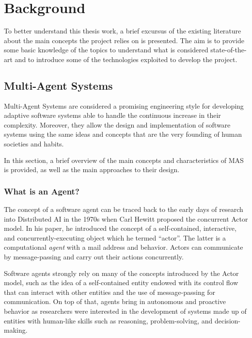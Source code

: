 \chapter{Background}\label{background}
To better understand this thesis work, a brief excursus of the existing literature about the main concepts the project relies on is presented. The aim is to provide some basic knowledge of the topics to understand what is considered state-of-the-art and to introduce some of the technologies exploited to develop the project.

\section{Multi-Agent Systems}
Multi-Agent Systems are considered a promising engineering style for developing adaptive software systems able to handle the continuous increase in their complexity.
Moreover, they allow the design and implementation of software systems using the same ideas and concepts that are the very founding of human societies and habits.

In this section, a brief overview of the main concepts and characteristics of MAS is provided, as well as the main approaches to their design.

\subsection{What is an Agent?}
The concept of a software agent can be traced back to the early days of research into Distributed AI in the 1970s when Carl Hewitt proposed the concurrent Actor model.
In his paper, he introduced the concept of a self-contained, interactive, and concurrently-executing object which he termed ``actor''.
The latter is a computational \textit{agent} with a mail address and behavior.
Actors can communicate by message-passing and carry out their actions concurrently.~\cite{hewitt1977viewing}

Software agents strongly rely on many of the concepts introduced by the Actor model, such as the idea of a self-contained entity endowed with its control flow that can interact with other entities and the use of message-passing for communication.
On top of that, agents bring in autonomous and proactive behavior as researchers were interested in the development of systems made up of entities with human-like skills such as reasoning, problem-solving, and decision-making.

